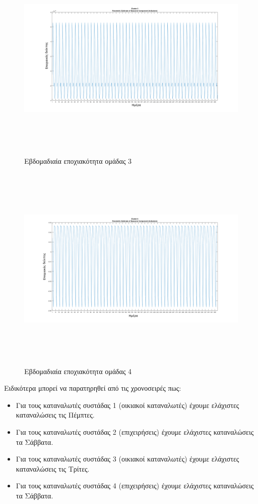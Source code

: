 \begin{figure}[ht!]
\centering
\includegraphics[width=180mm, height=100mm]{../../plots/Trend_estimation/seasonal_3.png}
\caption{Εβδομαδιαία εποχιακότητα ομάδας 3}
\label{fig:season 3}
\end{figure}
\begin{figure}[ht!]
\centering
\includegraphics[width=180mm, height=100mm]{../../plots/Trend_estimation/seasonal_4.png}
\caption{Εβδομαδιαία εποχιακότητα ομάδας 4}
\label{fig:season 4}
\end{figure}
\newpage
Ειδικότερα μπορεί να παρατηρηθεί από τις χρονοσειρές πως:
\begin{itemize}
\item Για τους καταναλωτές συστάδας 1 (οικιακοί καταναλωτές) έχουμε ελάχιστες καταναλώσεις τις Πέμπτες.
\item Για τους καταναλωτές συστάδας 2 (επιχειρήσεις) έχουμε ελάχιστες καταναλώσεις τα Σάββατα.
\item Για τους καταναλωτές συστάδας 3 (οικιακοί καταναλωτές) έχουμε ελάχιστες καταναλώσεις τις Τρίτες.
\item Για τους καταναλωτές συστάδας 4 (επιχειρήσεις) έχουμε ελάχιστες καταναλώσεις τα Σάββατα.
\end{itemize}
